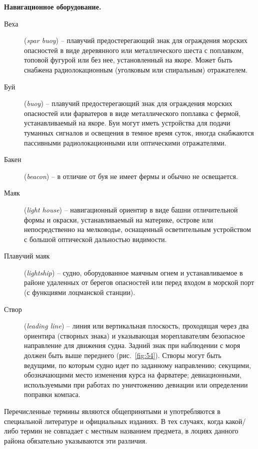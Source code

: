 \documentclass[a4paper, 12pt, twoside, final, book, russian, fittopage, cyremdash]{ncc}
\newcommand{\ris}[1]{\ref{fig:#1}}
\begin{document}
\textbf{Навигационное оборудование.}

\begin{description}
\item [Веха] (\textit{spar buoy}) \--- плавучий предостерегающий знак для ограждения морских опасностей в виде деревянного или металлического шеста с поплавком, топовой фугурой или без нее, установленный на якоре. Может быть снабжена радиолокационным (уголковым или спиральным) отражателем. 
\item [Буй] (\textit{buoy}) \--- плавучий предостерегающий знак для ограждения морских опасностей или фарватеров в виде металлического поплавка с фермой, устанавливаемый на якоре. Буи могут иметь устройства для подачи туманных сигналов и освещения в темное время суток, иногда снабжаются пассивными радиолокационными или оптическими отражателями. 
\item [Бакен] (\textit{beacon}) \--- в отличие от буя не имеет фермы и обычно не освещается. 
\item [Маяк] (\textit{light house}) \--- навигационный ориентир в виде башни отличительной формы и окраски, устанавливаемый на материке, острове или непосредственно на мелководье, оснащенный осветительным устройством с большой оптической дальностью видимости. 
\item [Плавучий маяк] (\textit{lightship}) \--- судно, оборудованное маячным огнем и устанавливаемое в районе удаленных от берегов опасностей или перед входом в морской порт (с функциями лоцманской станции). 
\item [Створ] (\textit{leading line}) \--- линия или вертикальная плоскость, проходящая через два ориентира (створных знака) и указывающая мореплавателям безопасное направление для движения судна. Задний знак при наблюдении с моря должен быть выше переднего (рис.~\ris{54}). Створы могут быть ведущими, по которым судно идет по заданному направлению; секущими, обозначающими место изменения курса на фарватере; девиационными, используемыми при работах по уничтожению девиации или определении поправки компаса. 
\end{description}

Перечисленные термины являются общепринятыми и употребляются в специальной литературе и официальных изданиях. В тех случаях, когда какой\-/либо термин не совпадает с местным названием предмета, в лоциях данного района обязательно указываются эти различия. 
\end{document}
